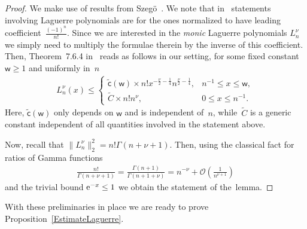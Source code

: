\begin{proof}We make use of results from Szeg\"{o}~\cite{Szego}. We note that in~\cite{Szego} statements involving Laguerre polynomials are for the ones normalized to have leading coefficient~$\frac{(-1)^n}{n!}$. Since we are interested in the \textit{monic} Laguerre polynomials $L_n^{\nu}$ we simply need to multiply the formulae therein by the inverse of this coefficient. Then, Theorem~7.6.4 in~\cite{Szego} reads as follows in our setting, for some fixed constant $\mathsf{w}\ge 1$ and uniformly in~$n$
\begin{gather*}
L_n^{\nu}(x)\le \begin{cases}
\tilde{\mathsf{c}}(\mathsf{w})\times n! x^{-\frac{\nu}{2}-\frac{1}{4}}n^{\frac{\nu}{2}-\frac{1}{4}}, & n^{-1}\le x \le \mathsf{w},\\
\tilde{C} \times n! n^{\nu}, & 0 \le x \le n^{-1}.
\end{cases}
\end{gather*}
Here, $\tilde{\mathsf{c}}(\mathsf{w})$ only depends on $\mathsf{w}$ and is independent of~$n$, while~$\tilde{C}$ is a generic constant independent of all quantities involved in the statement above.

Now, recall that $\|L_n^{\nu}\|_2^2=n! \Gamma(n+\nu+1)$. Then, using the classical fact for ratios of Gamma functions
\begin{gather*}
\frac{n!}{\Gamma(n+\nu+1)}=\frac{\Gamma(n+1)}{\Gamma(n+1+\nu)}= n^{-\nu}+\mathcal{O}\left(\frac{1}{n^{\nu+1}}\right)
\end{gather*}
and the trivial bound ${\rm e}^{-x}\le 1$ we obtain the statement of the~lemma.
\end{proof}

With these preliminaries in place we are ready to prove Proposition~\ref{EstimateLaguerre}.

